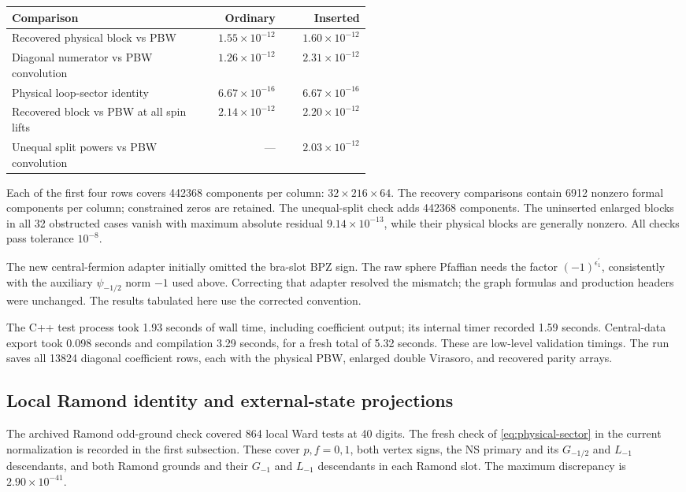 \documentclass[11pt]{article}
\numberwithin{equation}{section}
\begin{document}
\begin{center}
\small
\begin{tabular}{@{}p{0.53\linewidth}rr@{}}
\toprule
Comparison & Ordinary & Inserted\\
\midrule
Recovered physical block vs PBW & $1.55\times10^{-12}$ & $1.60\times10^{-12}$\\
Diagonal numerator vs PBW convolution & $1.26\times10^{-12}$ & $2.31\times10^{-12}$\\
Physical loop-sector identity & $6.67\times10^{-16}$ & $6.67\times10^{-16}$\\
Recovered block vs PBW at all spin lifts & $2.14\times10^{-12}$ & $2.20\times10^{-12}$\\
Unequal split powers vs PBW convolution & --- & $2.03\times10^{-12}$\\
\bottomrule
\end{tabular}
\end{center}
Each of the first four rows covers 442368 components per column:
$32\times216\times64$. The recovery comparisons contain 6912 nonzero
formal components per column; constrained zeros are retained.
The unequal-split check adds 442368 components. The uninserted enlarged
blocks in all 32 obstructed cases vanish with maximum absolute residual
$9.14\times10^{-13}$, while their physical blocks are generally nonzero.
All checks pass tolerance $10^{-8}$.

The new central-fermion adapter initially omitted the bra-slot BPZ sign.
The raw sphere Pfaffian needs the factor $(-1)^{\epsilon^{\prime}_1}$, consistently
with the auxiliary $\psi_{-1/2}$ norm $-1$ used above. Correcting that
adapter resolved the mismatch; the graph formulas and production headers
were unchanged. The results tabulated here use the corrected convention.

The C++ test process took 1.93 seconds of wall time, including coefficient
output; its internal timer recorded 1.59 seconds. Central-data export took
0.098 seconds and compilation 3.29 seconds, for a fresh total of
5.32 seconds. These are low-level validation timings. The run saves all
13824 diagonal coefficient rows, each with the physical PBW, enlarged
double Virasoro, and recovered parity arrays.

\subsection{Local Ramond identity and external-state projections}

The archived Ramond odd-ground check covered 864 local Ward tests at
40 digits. The fresh check of \eqref{eq:physical-sector} in the current
normalization is recorded in the first subsection. These cover $p,f=0,1$, both vertex
signs, the NS primary and its $G_{-1/2}$ and $L_{-1}$ descendants, and
both Ramond grounds and their $G_{-1}$ and $L_{-1}$ descendants in each
Ramond slot. The maximum discrepancy is $2.90\times10^{-41}$.
\end{document}
